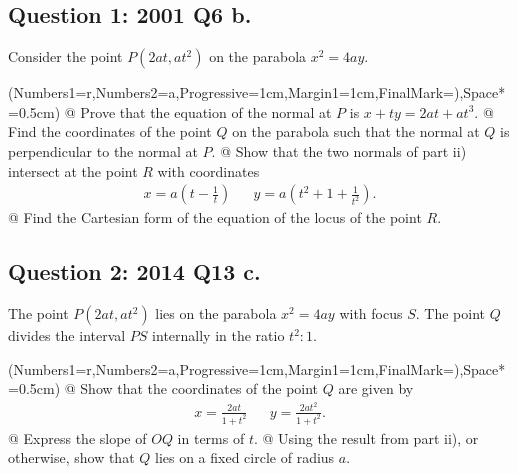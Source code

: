 \documentclass[a4paper,11pt]{article}
\begin{document}
	\subsection*{Question 1: 2001 Q6 b.}
	Consider the point $P(2at,at^2)$ on the parabola $x^2=4ay$.\\
    
	\begin{easylist}[enumerate]
		\ListProperties(Numbers1=r,Numbers2=a,Progressive=1cm,Margin1=1cm,FinalMark={)},Space*=0.5cm)
		@ Prove that the equation of the normal at $P$ is $x+ty=2at+at^3$.
        @ Find the coordinates of the point $Q$ on the parabola such that the normal at $Q$ is perpendicular to the normal at $P$.
        @ Show that the two normals of part ii) intersect at the point $R$ with coordinates 
        \begin{align*}
        x = a\left(t-\frac{1}{t}\right) && y = a\left(t^2+1+\frac{1}{t^2}\right).
        \end{align*}
        @ Find the Cartesian form of the equation of the locus of the point $R$.
	\end{easylist}
    
    
    \subsection*{Question 2: 2014 Q13 c.}
    The point $P(2at,at^2)$ lies on the parabola $x^2=4ay$ with focus $S$. The point $Q$ divides the interval $PS$ internally in the ratio $t^2:1$.\\
    
	\begin{easylist}[enumerate]
		\ListProperties(Numbers1=r,Numbers2=a,Progressive=1cm,Margin1=1cm,FinalMark={)},Space*=0.5cm)
		@ Show that the coordinates of the point $Q$ are given by 
        \begin{align*}
        x=\frac{2at}{1+t^2} && y=\frac{2at^2}{1+t^2}.
        \end{align*}
        @ Express the slope of $OQ$ in terms of $t$.
        @ Using the result from part ii), or otherwise, show that $Q$ lies on a fixed circle of radius $a$.
	\end{easylist}
    \pagebreak
\end{document}
